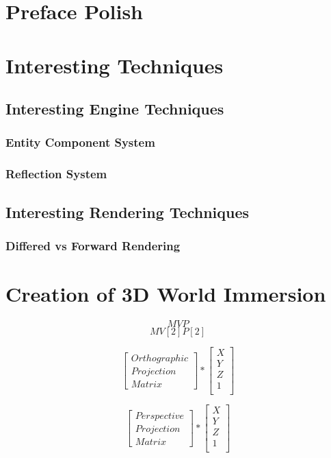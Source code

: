 \section{Preface Polish}  %
\newpage
\section{Interesting Techniques} %

\newpage
\subsection{Interesting Engine Techniques}
\subsubsection{Entity Component System}
\label{sec:theory_ecs}
\subsubsection{Reflection System}
\label{sec:refl}

\newpage
\subsection{Interesting Rendering Techniques}
\subsubsection{Differed vs Forward Rendering}

\newpage
\section{Creation of 3D World Immersion}
\[MVP\]
\[MV[2]P[2]\]

\[
\begin{bmatrix}
Orthographic\\
Projection \\
Matrix
\end{bmatrix} 
*
\begin{bmatrix}
X\\
Y\\
Z\\
1\\
\end{bmatrix} 
\]

\[
\begin{bmatrix}
Perspective\\
Projection \\
Matrix
\end{bmatrix} 
*
\begin{bmatrix}
X\\
Y\\
Z\\
1\\
\end{bmatrix} 
\]

